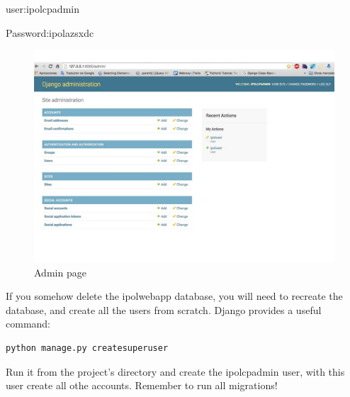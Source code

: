 user:ipolcpadmin

Password:ipolazsxdc

\begin{figure}[!ht]
\centering
\includegraphics[width=0.5\columnwidth]{images/admin}
\caption{Admin page} 
\label{fi:admin_page}
\end{figure}


If you somehow delete the ipolwebapp database, you will need to recreate the database, and create all the users from scratch. Django provides a useful command: 

\begin{lstlisting}[language=Python,firstnumber=1]
python manage.py createsuperuser
\end{lstlisting}

Run it from the project's directory and create the ipolcpadmin user, 
with this user create all othe accounts.
Remember to run all migrations!




